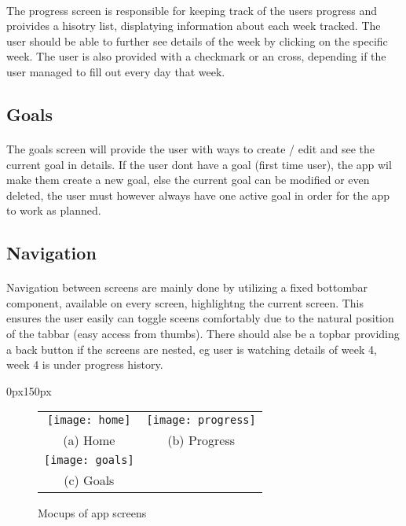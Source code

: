 \documentclass{article}
\begin{document}
    \paragraph{}
    The progress screen is responsible for keeping track of the users progress and proivides a hisotry list, displatying
    information about each week tracked. The user should be able to further see details of the week by clicking on the specific week.
    The user is also provided with a checkmark or an cross, depending if the user managed to fill out every day that week.
   
    \hfill \break

  \subsection{Goals}
    \paragraph{}
    The goals screen will provide the user with ways to create / edit and see the current goal in details. 
    If the user dont have a goal (first time user), the app wil make them create a new goal, else the current goal can be modified
    or even deleted, the user must however always have one active goal in order for the app to work as planned.
    
    \hfill \break

  \subsection{Navigation}
    \paragraph{}
    Navigation between screens are mainly done by utilizing a fixed bottombar component, available on every screen, highlightng the current
    screen. This ensures the user easily can toggle sceens comfortably due to the natural position of the tabbar (easy access from thumbs). 
    There should alse be a topbar providing a back button if the screens are nested, eg user is watching details of week 4, week 4 is under progress history.

\begin{adjustwidth}{0px}{150px}
  \begin{figure}
    \begin{tabular}{cc}
      \texttt{[image: home]} & \texttt{[image: progress]} \\
    (a) Home & (b) Progress \\[25pt]
    \texttt{[image: goals]}\\
    (c) Goals \\[25pt]
    \end{tabular}
    \caption{Mocups of app screens}
  \end{figure}
\end{adjustwidth}
\end{document}
